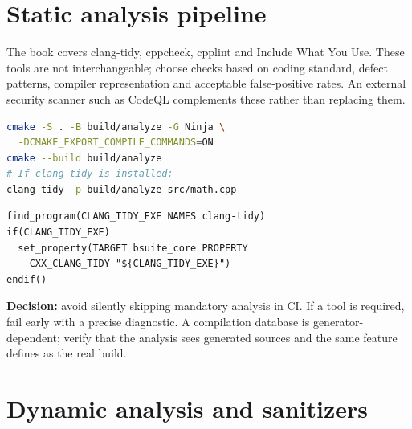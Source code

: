 \documentclass[11pt,letterpaper,oneside]{report}
\begin{document}
\chapter{Static analysis pipeline}\label{static-analysis-pipeline}

The book covers clang-tidy, cppcheck, cpplint and Include What You Use.
These tools are not interchangeable; choose checks based on coding
standard, defect patterns, compiler representation and acceptable
false-positive rates. An external security scanner such as CodeQL
complements these rather than replacing them.

\begin{lstlisting}[language=sh]
cmake -S . -B build/analyze -G Ninja \
  -DCMAKE_EXPORT_COMPILE_COMMANDS=ON
cmake --build build/analyze
# If clang-tidy is installed:
clang-tidy -p build/analyze src/math.cpp
\end{lstlisting}

\begin{lstlisting}
find_program(CLANG_TIDY_EXE NAMES clang-tidy)
if(CLANG_TIDY_EXE)
  set_property(TARGET bsuite_core PROPERTY
    CXX_CLANG_TIDY "${CLANG_TIDY_EXE}")
endif()
\end{lstlisting}

\textbf{Decision:} avoid silently skipping mandatory analysis in CI. If
a tool is required, fail early with a precise diagnostic. A compilation
database is generator-dependent; verify that the analysis sees generated
sources and the same feature defines as the real build.

\chapter{Dynamic analysis and
sanitizers}\label{dynamic-analysis-and-sanitizers}
\end{document}
